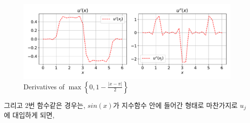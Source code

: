 \documentclass[11pt]{article}
\begin{document}
\begin{figure}[!ht]
  \centering
  \includegraphics[width=1\textwidth]{Differntiation_1.pdf}
  \caption{Derivatives of $ \max\left\{0, 1 - \frac{|x - \pi|}{2}\right\}$}
\end{figure}

\pagebreak

그리고 2번 함수같은 경우는, $sin(x)$가 지수함수 안에 들어간 형태로 마찬가지로 $u_j$에 대입하게 되면,
\end{document}
